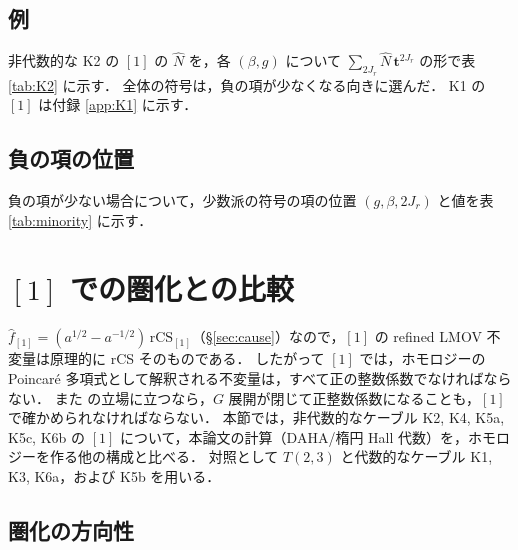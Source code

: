 \documentclass[11pt,a4paper]{ltjsarticle}
\theoremstyle{definition}
\theoremstyle{remark}
\newcommand{\bt}{\mathbf{t}}
\newcommand{\hN}{\widehat{N}}
\newcommand{\hf}{\widehat{f}}
\begin{document}
\subsection{例}

非代数的な K2 の $[1]$ の $\hN$ を，各 $(\beta,g)$ について $\sum_{2J_r}\hN\,\bt^{2J_r}$ の形で表 \ref{tab:K2} に示す．
全体の符号は，負の項が少なくなる向きに選んだ．
K1 の $[1]$ は付録 \ref{app:K1} に示す．

\begin{table}[h]
\centering
\caption{K2（$T(2,3)$ の $(2,1)$-ケーブル），$\rho=[1]$ の $\sum_{2J_r}\hN_{[1],g,\beta,J_r}\bt^{2J_r}$．}\label{tab:K2}
\small

\end{table}

\subsection{負の項の位置}

負の項が少ない場合について，少数派の符号の項の位置 $(g,\beta,2J_r)$ と値を表 \ref{tab:minority} に示す．

\begin{table}[h]
\centering
\caption{少数派の符号の項（$(g,\beta,2J_r)\!:\hN$）と，それらの $2J_r-\beta-g$ の値．}\label{tab:minority}
\footnotesize

\end{table}

\section{$[1]$ での圏化との比較}\label{sec:categorification}

$\hf_{[1]}=(a^{1/2}-a^{-1/2})\,\mathrm{rCS}_{[1]}$（\S\ref{sec:cause}）なので，$[1]$ の refined LMOV 不変量は原理的に rCS そのものである．
したがって $[1]$ では，ホモロジーの Poincaré 多項式として解釈される不変量は，すべて正の整数係数でなければならない．
また \cite{KN} の立場に立つなら，$G$ 展開が閉じて正整数係数になることも，$[1]$ で確かめられなければならない．
本節では，非代数的なケーブル K2, K4, K5a, K5c, K6b の $[1]$ について，本論文の計算（DAHA/楕円 Hall 代数）を，ホモロジーを作る他の構成と比べる．
対照として $T(2,3)$ と代数的なケーブル K1, K3, K6a，および K5b を用いる．

\subsection{圏化の方向性}
\end{document}
